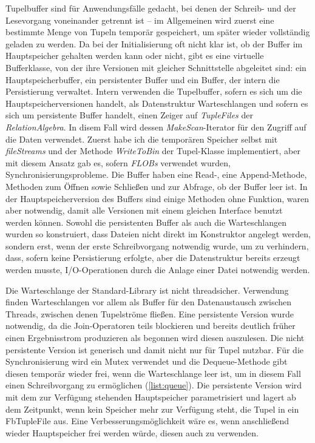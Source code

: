 \documentclass[a4paper,12pt,twoside]{article}
\newcommand{\Fb}[1]{\textit{#1}} %
\begin{document}
{Tupelbuffer sind für Anwendungsfälle gedacht, bei denen der Schreib- und der Lesevorgang voneinander getrennt ist -- im Allgemeinen wird zuerst eine bestimmte Menge von Tupeln temporär gespeichert, um später wieder vollständig geladen zu werden. Da bei der Initialisierung oft nicht klar ist, ob der Buffer im Hauptspeicher gehalten werden kann oder nicht, gibt es eine virtuelle Bufferklasse, von der ihre Versionen mit gleicher Schnittstelle abgeleitet sind: ein Hauptspeicherbuffer, ein persistenter Buffer und ein Buffer, der intern die Persistierung verwaltet. Intern verwenden die Tupelbuffer, sofern es sich um die Hauptspeicherversionen handelt, als Datenstruktur Warteschlangen und sofern es sich um persistente Buffer handelt, einen Zeiger auf \Fb{TupleFiles} der \Fb{RelationAlgebra}. In disem Fall wird dessen \Fb{MakeScan}-Iterator für den Zugriff auf die Daten verwendet. Zuerst habe ich die temporären Speicher selbst mit \Fb{fileStreams} und der Methode \Fb{WriteToBin} der Tupel-Klasse implementiert, aber mit diesem Ansatz gab es, sofern \Fb{FLOBs} verwendet wurden, Synchronisierungsprobleme. Die Buffer haben eine Read-, eine Append-Methode, Methoden zum Öffnen sowie Schließen und zur Abfrage, ob der Buffer leer ist. In der Hauptspeicherversion des Buffers sind einige Methoden ohne Funktion, waren aber notwendig, damit alle Versionen mit einem gleichen Interface benutzt werden können. Sowohl die persistenten Buffer als auch die Warteschlangen wurden so konstruiert, dass Dateien nicht direkt im Konstruktor angelegt werden, sondern erst, wenn der erste Schreibvorgang notwendig wurde, um zu verhindern, dass, sofern keine Persistierung erfolgte, aber die Datenstruktur bereits erzeugt werden musste, I/O-Operationen durch die Anlage einer Datei notwendig werden.

Die Warteschlange der Standard-Library ist nicht threadsicher. Verwendung finden Warteschlangen vor allem als Buffer für den Datenaustausch zwischen Threads, zwischen denen Tupelströme fließen. Eine persistente Version wurde notwendig, da die Join-Operatoren teils blockieren und bereits deutlich früher einen Ergebnisstrom produzieren als begonnen wird diesen auszulesen. Die nicht persistente Version ist generisch und damit nicht nur für Tupel nutzbar. Für die Synchronisierung wird ein Mutex verwendet und die Dequeue-Methode gibt diesen temporär wieder frei, wenn die Warteschlange leer ist, um in diesem Fall einen Schreibvorgang zu ermöglichen (\autoref{list:queue}). Die persistente Version wird mit dem zur Verfügung stehenden Hauptspeicher parametrisiert und lagert ab dem Zeitpunkt, wenn kein Speicher mehr zur Verfügung steht, die Tupel in ein Fb{TupleFile} aus. Eine Verbesserungsmöglichkeit wäre es, wenn anschließend wieder Hauptspeicher frei werden würde, diesen auch zu verwenden.

}
\end{document}
